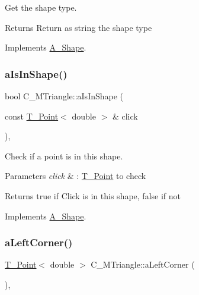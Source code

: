 Get the shape type. 

\begin{DoxyReturn}{Returns}
Return as string the shape type 
\end{DoxyReturn}


Implements \hyperlink{classA__Shape_a1b202256a4e5dcb0edab4ab93a37122c}{A\+\_\+\+Shape}.

\mbox{\label{classC__MTriangle_ae29e4f6608a0079507c6397b3dbef246}} 
\subsubsection{\texorpdfstring{a\+Is\+In\+Shape()}{aIsInShape()}}
{\footnotesize\ttfamily bool C\+\_\+\+M\+Triangle\+::a\+Is\+In\+Shape (\begin{DoxyParamCaption}\item[{const \hyperlink{classT__Point}{T\+\_\+\+Point}$<$ double $>$ \&}]{click }\end{DoxyParamCaption})\hspace{0.3cm}{\ttfamily [override]}, {\ttfamily [virtual]}}



Check if a point is in this shape. 


\begin{DoxyParams}{Parameters}
{\em click} & \+: \hyperlink{classT__Point}{T\+\_\+\+Point} to check \\
\hline
\end{DoxyParams}
\begin{DoxyReturn}{Returns}
true if Click is in this shape, false if not 
\end{DoxyReturn}


Implements \hyperlink{classA__Shape_a63f825cbc9780208d9a137f5c14917d0}{A\+\_\+\+Shape}.

\mbox{\label{classC__MTriangle_ad077fce026711bf0a25fc4c1cb83ecb9}} 
\subsubsection{\texorpdfstring{a\+Left\+Corner()}{aLeftCorner()}}
{\footnotesize\ttfamily \hyperlink{classT__Point}{T\+\_\+\+Point}$<$ double $>$ C\+\_\+\+M\+Triangle\+::a\+Left\+Corner (\begin{DoxyParamCaption}{ }\end{DoxyParamCaption})\hspace{0.3cm}{\ttfamily [override]}, {\ttfamily [virtual]}}



